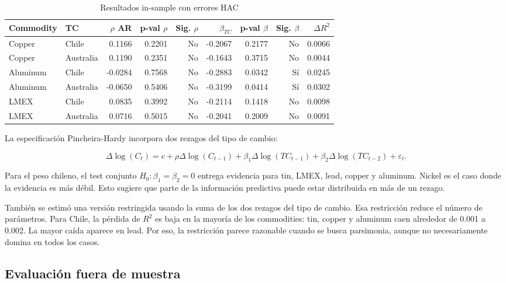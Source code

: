 \documentclass[11pt,letterpaper]{article}
\begin{document}
\begin{table}[H]
\centering
\caption{Resultados in-sample con errores HAC}
\scriptsize
\begin{tabular}{llrrrrrrr}
\toprule
Commodity & TC & $\rho$ AR & p-val $\rho$ & Sig. $\rho$ & $\beta_{TC}$ & p-val $\beta$ & Sig. $\beta$ & $\Delta R^2$ \\
\midrule
Copper & Chile & 0.1166 & 0.2201 & No & -0.2067 & 0.2177 & No & 0.0066 \\
Copper & Australia & 0.1190 & 0.2351 & No & -0.1643 & 0.3715 & No & 0.0044 \\
Aluminum & Chile & -0.0284 & 0.7568 & No & -0.2883 & 0.0342 & Sí & 0.0245 \\
Aluminum & Australia & -0.0650 & 0.5406 & No & -0.3199 & 0.0414 & Sí & 0.0302 \\
LMEX & Chile & 0.0835 & 0.3992 & No & -0.2114 & 0.1418 & No & 0.0098 \\
LMEX & Australia & 0.0716 & 0.5015 & No & -0.2041 & 0.2009 & No & 0.0091 \\
\bottomrule
\end{tabular}
\end{table}

La especificación Pincheira-Hardy incorpora dos rezagos del tipo de cambio:

\begin{equation}
\Delta \log(C_t)=c+\rho\Delta \log(C_{t-1})+\beta_1\Delta \log(TC_{t-1})+\beta_2\Delta \log(TC_{t-2})+\varepsilon_t.
\end{equation}

Para el peso chileno, el test conjunto $H_0:\beta_1=\beta_2=0$ entrega evidencia para tin, LMEX, lead, copper y aluminum. Nickel es el caso donde la evidencia es más débil. Esto sugiere que parte de la información predictiva puede estar distribuida en más de un rezago.

También se estimó una versión restringida usando la suma de los dos rezagos del tipo de cambio. Esa restricción reduce el número de parámetros. Para Chile, la pérdida de $R^2$ es baja en la mayoría de los commodities: tin, copper y aluminum caen alrededor de 0.001 a 0.002. La mayor caída aparece en lead. Por eso, la restricción parece razonable cuando se busca parsimonia, aunque no necesariamente domina en todos los casos.

\subsection{Evaluación fuera de muestra}
\end{document}
